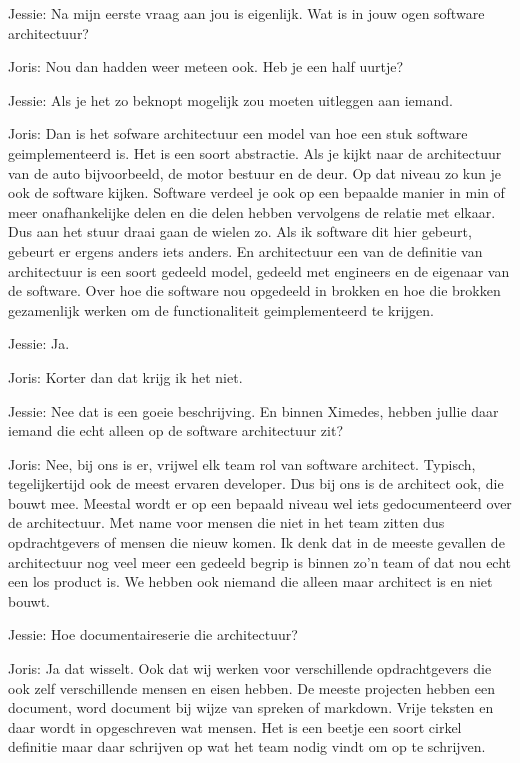Jessie: Na mijn eerste vraag aan jou is eigenlijk. Wat is in jouw ogen software architectuur?

Joris: Nou dan hadden weer meteen ook. Heb je een half uurtje?

Jessie: Als je het zo beknopt mogelijk zou moeten uitleggen aan iemand.

Joris: Dan is het sofware architectuur een model van hoe een stuk software geimplementeerd is. Het is een soort abstractie. Als je kijkt naar de architectuur van de auto bijvoorbeeld, de motor bestuur en de deur. Op dat niveau zo kun je ook de software kijken. Software verdeel je ook op een bepaalde manier in min of meer onafhankelijke delen en die delen hebben vervolgens de relatie met elkaar. Dus aan het stuur draai gaan de wielen zo. Als ik software dit hier gebeurt, gebeurt er ergens anders iets anders. En architectuur een van de definitie van architectuur is een soort gedeeld model, gedeeld met engineers en de eigenaar van de software. Over hoe die software nou opgedeeld in brokken en hoe die brokken gezamenlijk werken om de functionaliteit geimplementeerd te krijgen.

Jessie: Ja.

Joris: Korter dan dat krijg ik het niet.

Jessie: Nee dat is een goeie beschrijving. En binnen Ximedes, hebben jullie daar iemand die echt alleen op de software architectuur zit?

Joris: Nee, bij ons is er, vrijwel elk team rol van software architect. Typisch, tegelijkertijd ook de meest ervaren developer. Dus bij ons is de architect ook, die bouwt mee. Meestal wordt er op een bepaald niveau wel iets gedocumenteerd over de architectuur. Met name voor mensen die niet in het team zitten dus opdrachtgevers of mensen die nieuw komen. Ik denk dat in de meeste gevallen de architectuur nog veel meer een gedeeld begrip is binnen zo'n team of dat nou echt een los product is. We hebben ook niemand die alleen maar architect is en niet bouwt.

Jessie: Hoe documentaireserie die architectuur?

Joris: Ja dat wisselt. Ook dat wij werken voor verschillende opdrachtgevers die ook zelf verschillende mensen en eisen hebben. De meeste projecten hebben een document, word document bij wijze van spreken of markdown. Vrije teksten en daar wordt in opgeschreven wat mensen. Het is een beetje een soort cirkel definitie maar daar schrijven op wat het team nodig vindt om op te schrijven.

